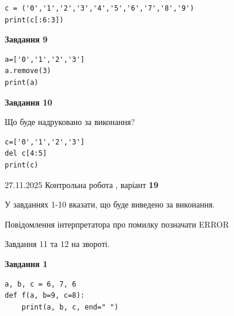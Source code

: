\documentclass[12pt, ukrainian]{article}
\begin{document}
{{{{{{{{{{{{{{{{{{{\begin{minipage}[t]{10.5cm}
\begin{verbatim}
c = ('0','1','2','3','4','5','6','7','8','9')
print(c[:6:3])
\end{verbatim}



\begin{center}
\textbf{Завдання 9}
\end{center}

\begin{verbatim}
a=['0','1','2','3']
a.remove(3)
print(a)
\end{verbatim}



\begin{center}
\textbf{Завдання 10}
\end{center}
Що буде надруковано за виконання?\par
\begin{verbatim}
c=['0','1','2','3']
del c[4:5]
print(c)
\end{verbatim}

\end{minipage}

}
\newpage

{{ 27.11.2025 Контрольна робота , варіант  \No \textbf { 19 }\par}}
{

{%



У завданнях 1-10 вказати, що буде виведено за виконання.

Повідомлення інтерпретатора про помилку позначати ERROR

Завдання 11 та 12 на звороті.

\begin{minipage}[t]{7.5cm}

\begin{center}
\textbf{Завдання 1}
\end{center}

\begin{verbatim}
a, b, c = 6, 7, 6
def f(a, b=9, c=8):
    print(a, b, c, end=" ")


\end{verbatim}
\end{minipage}}}}}}}}}}}}}}}}}}}}}
\end{document}
